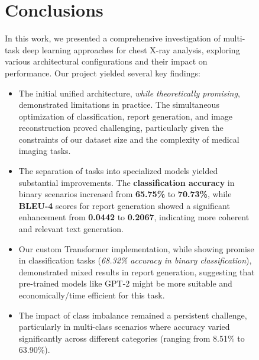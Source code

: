 \documentclass[a4paper,12pt]{article}
\begin{document}
\begin{figure}
    \section{Conclusions}

    In this work, we presented a comprehensive investigation of multi-task deep learning approaches for chest X-ray analysis, exploring various architectural configurations and their impact on performance. Our project yielded several key findings:

    \begin{itemize}
        \item The initial unified architecture, \textit{while theoretically promising}, demonstrated limitations in practice. 
        The simultaneous optimization of classification, report generation, and image reconstruction proved challenging, particularly given the constraints of our dataset size and the complexity of medical imaging tasks.
        
        \item The separation of tasks into specialized models yielded substantial improvements. 
        The \textbf{classification accuracy} in binary scenarios increased from \textbf{65.75\%} to \textbf{70.73\%}, while \textbf{BLEU-4} scores for report generation showed a significant enhancement from \textbf{0.0442} to \textbf{0.2067}, indicating more coherent and relevant text generation.
        
        \item Our custom Transformer implementation, while showing promise in classification tasks (\textit{68.32\% accuracy in binary classification}), demonstrated mixed results in report generation, suggesting that pre-trained models like GPT-2 might be more suitable and economically/time efficient for this task.
        
        \item The impact of class imbalance remained a persistent challenge, particularly in multi-class scenarios where accuracy varied significantly across different categories (ranging from 8.51\% to 63.90\%).
    \end{itemize}
\end{figure}
\end{document}
